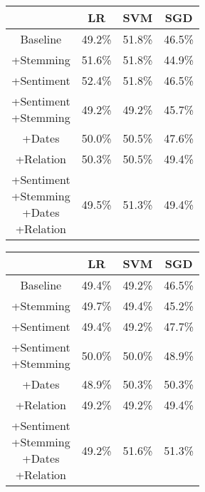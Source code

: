 \documentclass[11pt,a4paper]{article}
\begin{document}
\begin{center}
\begin{tabular}{ |c|c|c|c| }
 \hline
  & LR & SVM & SGD \\
  \hline
  Baseline & 49.2\% & 51.8\% & 46.5\% \\
  \hline
 +Stemming & 51.6\% & 51.8\% & 44.9\% \\
  \hline
 +Sentiment & 52.4\% & 51.8\% & 46.5\% \\
  \hline
  \shortstack{+Sentiment \\ +Stemming} & 49.2\% & 49.2\% & 45.7\%\\
 \hline
 +Dates & 50.0\% & 50.5\% & 47.6\% \\
  \hline
 +Relation & 50.3\% & 50.5\% & 49.4\% \\
  \hline
  \shortstack{+Sentiment \\ +Stemming \\+Dates \\+Relation} & 49.5\% & 51.3\% & 49.4\% \\
 \hline
\end{tabular}
\end{center}

\begin{center}
\vspace{40mm}
\begin{tabular}{ |c|c|c|c| }
 \hline
  & LR & SVM & SGD \\
  \hline
  Baseline & 49.4\% & 49.2\% & 46.5\% \\
  \hline
 +Stemming & 49.7\% & 49.4\% & 45.2\% \\
  \hline
 +Sentiment & 49.4\% & 49.2\% & 47.7\% \\
  \hline
  \shortstack{+Sentiment \\ +Stemming} & 50.0\% & 50.0\% & 48.9\%\\
 \hline
 +Dates & 48.9\% & 50.3\% & 50.3\% \\
  \hline
 +Relation & 49.2\% & 49.2\% & 49.4\% \\
  \hline
  \shortstack{+Sentiment \\ +Stemming \\+Dates \\+Relation} & 49.2\% & 51.6\% & 51.3\% \\
 \hline
\end{tabular}
\end{center}
\end{document}
